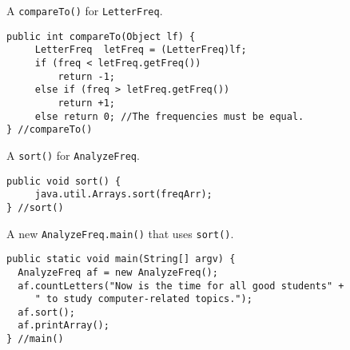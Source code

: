 \begin{ANS}
\item A {\tt compareTo()} for {\tt LetterFreq}.

\begin{jjjlisting}
\begin{lstlisting}
public int compareTo(Object lf) {
     LetterFreq  letFreq = (LetterFreq)lf;
     if (freq < letFreq.getFreq())
         return -1;
     else if (freq > letFreq.getFreq())
         return +1;
     else return 0; //The frequencies must be equal.
} //compareTo()
\end{lstlisting}
\end{jjjlisting}

\item A {\tt sort()} for {\tt AnalyzeFreq}.

\begin{jjjlisting}
\begin{lstlisting}
public void sort() {
     java.util.Arrays.sort(freqArr);
} //sort()
\end{lstlisting}
\end{jjjlisting}

\item A new {\tt AnalyzeFreq.main()} that uses {\tt sort()}.

\begin{jjjlisting}
\begin{lstlisting}
public static void main(String[] argv) {
  AnalyzeFreq af = new AnalyzeFreq();
  af.countLetters("Now is the time for all good students" +
     " to study computer-related topics.");
  af.sort();
  af.printArray();
} //main()
\end{lstlisting}
\end{jjjlisting}

\end{ANS}

\label{exercises}

